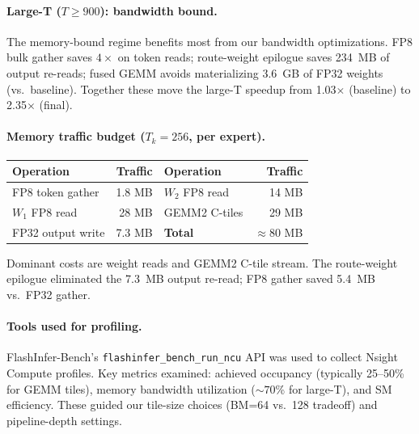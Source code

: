 \paragraph{Large-T ($T\!\ge\!900$): bandwidth bound.}
The memory-bound regime benefits most from our bandwidth optimizations.
FP8 bulk gather saves $4\times$ on token reads; route-weight epilogue saves 234~MB of output re-reads; fused GEMM avoids materializing 3.6~GB of FP32 weights (vs.\ baseline).
Together these move the large-T speedup from 1.03$\times$ (baseline) to 2.35$\times$ (final).

\paragraph{Memory traffic budget ($T_k{=}256$, per expert).}
\begin{center}\small\setlength{\tabcolsep}{4pt}
\begin{tabular}{lr|lr}
\toprule
Operation & Traffic & Operation & Traffic \\
\midrule
FP8 token gather  & 1.8 MB  & $W_2$ FP8 read  & 14 MB \\
$W_1$ FP8 read    & 28 MB   & GEMM2 C-tiles   & 29 MB \\
FP32 output write & 7.3 MB  & \textbf{Total}  & $\approx$80 MB \\
\bottomrule
\end{tabular}
\end{center}
Dominant costs are weight reads and GEMM2 C-tile stream.
The route-weight epilogue eliminated the 7.3~MB output re-read; FP8 gather saved 5.4~MB vs.\ FP32 gather.

\paragraph{Tools used for profiling.}
FlashInfer-Bench's \texttt{flashinfer\_bench\_run\_ncu} API was used to collect Nsight Compute profiles.
Key metrics examined: achieved occupancy (typically 25--50\% for GEMM tiles), memory bandwidth utilization (${\sim}70$\% for large-T), and SM efficiency.
These guided our tile-size choices (BM=64 vs.\ 128 tradeoff) and pipeline-depth settings.
